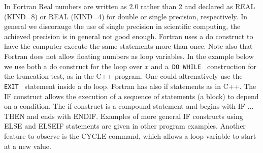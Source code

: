 In Fortran 
Real numbers are written as 2.0 rather than 2 and declared
as REAL (KIND=8) or REAL (KIND=4) for double or single precision, respectively. 
In general we discorauge the use of
single precision in scientific computing, the achieved precision is in general not good enough. 
Fortran  uses a do construct to have the computer 
execute the same statements more than once. 
Note also that Fortran  does
not allow floating numbers as loop variables.
In the example below we use both a do construct for the loop over $x$ and a\verb? DO WHILE ?
construction for the truncation test, as in the C++ program. One could altrenatively use the
\verb? EXIT ? statement inside a do loop. 
Fortran  has also if statements as in C++.
The IF construct allows the execution of a sequence of statements (a block) to depend on a
condition. The if construct is a compound statement and begins with IF ... THEN and ends
with ENDIF. Examples of more
general IF constructs using ELSE and ELSEIF statements are 
given in other program examples.
Another feature to observe is the CYCLE command, which allows  
a loop variable  to start at a new value.


